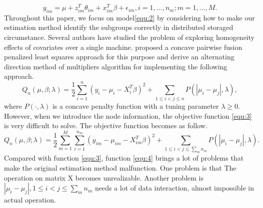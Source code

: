 \documentclass[review]{elsarticle}
\begin{document}
\begin{equation}
\label{equ:2}
y_{im} = \mu+z_{im}^T\theta_{im} + x_{im}^T\beta + \epsilon_{im}, i=1,...,n_m; m=1,...,M.
\end{equation}
Throughout this paper, we focus on model\ref{equ:2} by considering how to make our estimation method identify the subgroups correctly in distributed storaged circumstance. Several authors have studied the problem of exploring homogeneity effects of covariates over a single machine. \cite{ma2017concave} proposed a concave pairwise fusion penalized least squares approach for this purpose and derive an alternating direction method of multipliers algorithm \cite{boyd2011distributed} for implementing the following approach.
\begin{equation}
\label{equ:3}
Q_n(\mu, \beta;\lambda) = \frac{1}{2}\sum_{i=1}^n(y_i-\mu_i-X_i^T\beta)^2+\sum_{1\leq i<j\leq n}P(|\mu_i-\mu_j|,\lambda),
\end{equation}
where $P(\cdot,\lambda)$ is a concave penalty function with a tuning parameter $\lambda\geq0$. However, when we introduce the node information, the objective function \ref{equ:3} is very difficult to solve. The objective function becomes
as follow.
\begin{equation}
\label{equ:4}
Q_n(\mu, \beta;\lambda) = \frac{1}{2}\sum_{m=1}^M\sum_{i=1}^{n_m}(y_{im}-\mu_{im}-X_{im}^T\beta)^2+\sum_{1\leq i<j\leq \sum_m{n_m}}P(|\mu_{i}-\mu_{j}|,\lambda).
\end{equation}
Compared with function \ref{equ:3}, function \ref{equ:4} brings a lot of problems that make the original estimation method malfunction. One problem is that The operation on matrix X becomes unrealizable. Another problem is $|\mu_i-\mu_j|, 1\leq i<j\leq \sum_m{n_m}$ needs a lot of data interaction, almost impossible in actual operation.
\end{document}
